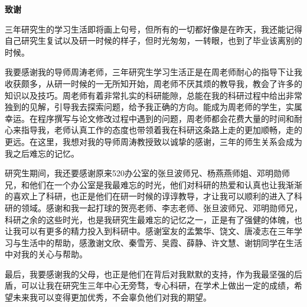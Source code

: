 \begin{center}
	\bf 致谢
\end{center}

三年研究生的学习生活即将画上句号，但所有的一切都好像是在昨天，我还能记得自己研究生复试以及研一时候的样子，但时光匆匆，一转眼，也到了毕业该离别的时候。

我要感谢我的导师周涛老师，三年研究生学习生活正是在周老师耐心的指导下让我收获颇多，从研一时候的一无所知开始，周老师不厌其烦的教导我，教会了许多的知识以及技巧。周老师有着非常扎实的科研能隙，总能在我的科研过程中给出非常独到的见解，引导我去探索问题，给予我正确的方向。能成为周老师的学生，实属幸运。在程序撰写与论文修改过程中遇到的问题，周老师都会花费大量的时间和耐心来指导我，老师认真工作的态度也带领着我在科研这条路上走的更加顺畅，走的更远。在这里，我想对我的导师周涛教授致以诚挚的感谢，三年的师生关系会成为我之后难忘的记忆。

研究生期间，我还要感谢原来520办公室的张旦波师兄、杨燕燕师姐、邓明勋师兄，和他们在一个办公室是我最难忘的时光，他们对科研的热爱和认真也让我渐渐的喜欢上了科研，也正是他们在研一时候的谆谆教导，才让我可以顺利的进入了科研的领域。感谢和我一起打球的贺亮老师、李志老师、张旦波师兄、邓明勋师兄，科研之余的这些时光，也是我研究生最难忘的记忆之一，正是有了强健的体魄，也让我可以有更多的精力投入到科研中。感谢室友的孟繁华、饶文、唐凌志在三年学习与生活中的帮助，感激谢文欣、秦雪芳、吴霞、薛静、许文慧、谢钥同学在生活中对我的关心与帮助。

最后，我要感谢我的父母，也正是他们在背后对我默默的支持，作为我最坚强的后盾，可以让我在研究生三年中心无旁骛，专心科研，在学术上做出一定的成绩，希望未来我可以变得更加优秀，不会辜负他们对我的期望。







